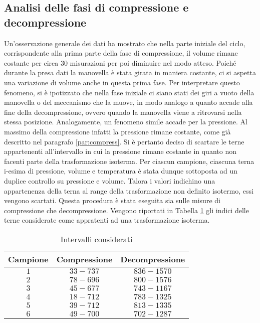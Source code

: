 \documentclass[a4paper,11pt,oneside]{article}
\begin{document}
\subsection{Analisi delle fasi di compressione e decompressione}
Un'osservazione generale dei dati ha mostrato che nella parte iniziale del ciclo, corrispondente alla prima parte della fase di compressione, il volume rimane costante per circa 30 misurazioni per poi diminuire nel modo atteso. Poiché durante la presa dati la manovella è stata girata in maniera costante, ci si aspetta una variazione di volume anche in questa prima fase. Per interpretare questo fenomeno, si è ipotizzato che nella fase iniziale ci siano stati dei giri a vuoto della manovella o del meccanismo che la muove, in modo analogo a quanto accade alla fine della decompressione, ovvero quando la manovella viene a ritrovarsi nella stessa posizione.
Analogamente, un fenomeno simile accade per la pressione. Al massimo della compressione infatti la pressione rimane costante, come già descritto nel paragrafo \ref{par:compress}. Si è pertanto deciso di scartare le terne appartenenti all'intervallo in cui la pressione rimane costante in quanto non facenti parte della trasformazione isoterma.
Per ciascun campione, ciascuna terna i-esima di pressione, volume e temperatura è stata dunque sottoposta ad un duplice controllo su pressione e volume. Talora i valori indichino una appartenenza della terna al range della trasformazione non definito isotermo, essi vengono scartati. Questa procedura è stata eseguita sia sulle misure di compressione che decompressione. Vengono riportati in Tabella \ref{tab:misure_scartate} gli indici delle terne considerate come appratenti ad una trasformazione isoterma. 
 
\begin{table}[h!]
    \centering
    \begin{tabular}{|c|c|c|}
        \hline
        \textbf{Campione} & \textbf{Compressione} & \textbf{Decompressione} \\ \hline
        \rowcolor[rgb]{0.85,0.85,0.85}$1$ & $33-737$ & $836-1570$ \\ \hline
        $2$ & $78-696$ & $800-1576$ \\ \hline
        \rowcolor[rgb]{0.85,0.85,0.85}$3$ & $45-677$ & $743-1167$ \\ \hline
        $4$ & $18-712$ & $783-1325$ \\ \hline
        \rowcolor[rgb]{0.85,0.85,0.85}$5$ & $39-712$ & $813-1335$ \\ \hline
        $6$ & $49-700$ & $702-1287$ \\ \hline
    \end{tabular}
    \caption{Intervalli considerati}
    \label{tab:misure_scartate}
\end{table}
\end{document}
